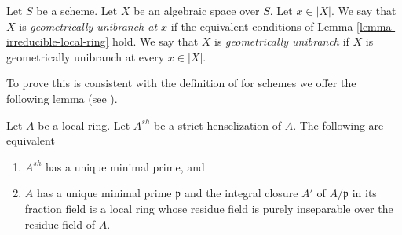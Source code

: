 \begin{definition}
\label{definition-unibranch}
Let $S$ be a scheme. Let $X$ be an algebraic space over $S$.
Let $x \in |X|$. We say that $X$ is {\it geometrically unibranch
at $x$} if the equivalent conditions of
Lemma \ref{lemma-irreducible-local-ring}
hold. We say that $X$ is {\it geometrically unibranch} if $X$ is
geometrically unibranch at every $x \in |X|$.
\end{definition}

\noindent
To prove this is consistent with the definition of \cite{EGA}
for schemes we offer the following lemma (see
\cite[Lemma 2.2]{Etale-coverings}).

\begin{lemma}
\label{lemma-geometrically-unibranch}
Let $A$ be a local ring. Let $A^{sh}$ be a strict henselization of $A$.
The following are equivalent
\begin{enumerate}
\item $A^{sh}$ has a unique minimal prime, and
\item $A$ has a unique minimal prime $\mathfrak p$ and
the integral closure $A'$ of $A/\mathfrak p$ in its fraction field is a
local ring whose residue field is purely inseparable over the residue
field of $A$.
\end{enumerate}
\end{lemma}

